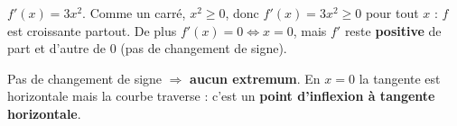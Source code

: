 \documentclass[11pt,a4paper]{article}
\begin{document}
\begin{corr}[5 --- $f(x)=x^3$]
$f'(x)=3x^2$. Comme un carré, $x^2\geq 0$, donc $f'(x)=3x^2\geq 0$ pour tout $x$ : $f$ est croissante partout.
De plus $f'(x)=0 \iff x=0$, mais $f'$ reste \textbf{positive} de part et d'autre de $0$ (pas de changement de signe).
\begin{center}
\end{center}
Pas de changement de signe $\Rightarrow$ \textbf{aucun extremum}. En $x=0$ la tangente est horizontale
mais la courbe traverse : c'est un \textbf{point d'inflexion à tangente horizontale}.
\end{corr}
\end{document}
